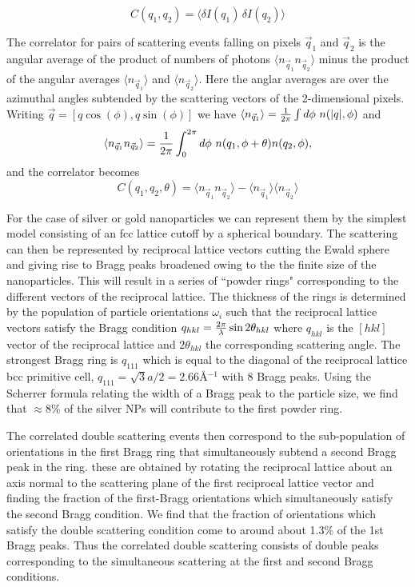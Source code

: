 \documentclass [11pt,fleqn]{article}
\def \be {\begin{equation}}
\def \ee {\end{equation}}
\begin{document}
\[
C(q_1, q_2) = \langle \delta I(q_1) \, \delta I(q_2) \rangle
\]

The correlator for pairs of scattering events falling on pixels $\vec{q}_1$ and $\vec{q}_2$ is the angular average of the product of numbers of photons $\langle n_{\vec{q}_1}n_{\vec{q}_2}\rangle$ minus the product of the angular averages $\langle n_{\vec{q}_1}\rangle$ and $\langle n_{\vec{q}_2}\rangle$.
Here the anglar averages are over the azimuthal angles subtended by the scattering vectors of the 2-dimensional pixels. Writing $\vec{q}=[q\cos(\phi),q\sin(\phi)]$ we have 
$\langle n_{\vec{q}_1}\rangle={1\over 2\pi}\int d\phi\ n(|q|,\phi) $ and
\be
\langle n_{\vec{q}_1}n_{\vec{q}_2}\rangle={1\over 2\pi}\int_0^{2\pi} d\phi\ n(q_1,\phi+\theta)n(q_2,\phi),
\ee
and the correlator becomes 
\be
C(q_1,q_2,\theta)=\langle n_{\vec{q}_1}n_{\vec{q}_2}\rangle-\langle n_{\vec{q}_1}\rangle \langle n_{\vec{q}_2}\rangle
\ee

For the case of silver or gold  nanoparticles we can represent them by the simplest model consisting of an fcc lattice cutoff by a spherical boundary. The scattering can then be represented by reciprocal lattice vectors cutting the Ewald sphere and giving rise to Bragg peaks broadened owing to the  the finite size of the nanoparticles.  This will result in a series of ``powder rings" corresponding to the different vectors of the reciprocal lattice. The thickness of the rings is determined by the population of particle orientations $\omega_i$ such that the reciprocal lattice vectors  satisfy the Bragg condition $q_{hkl}={2\pi\over\lambda}\sin 2\theta_{hkl}$ where $q_{hkl}$ is the $[hkl]$ vector of the reciprocal lattice and  $2\theta_{hkl}$ the corresponding scattering angle. The
strongest Bragg ring is $q_{111}$ which is equal to the diagonal of the reciprocal lattice bcc primitive cell, 
$q_{111}=\sqrt{3}a/2=2.66$\AA$^{-1}$ with 8 Bragg peaks. Using the Scherrer formula relating the width of a Bragg peak to the particle size, we find that $\approx 8\%$ of the silver NPs will contribute to the first powder ring. 

The correlated double scattering events then correspond to the sub-population of orientations in the first Bragg ring that simultaneously subtend a second Bragg peak in the ring. these are obtained by rotating the 
reciprocal lattice about an axis normal to the scattering plane of the first reciprocal lattice vector and finding the fraction of the first-Bragg orientations which simultaneously satisfy the second Bragg condition. 
We find that the fraction of orientations which satisfy the double scattering condition come to around about 1.3\% of the 1st Bragg peaks. Thus the correlated double scattering consists of double peaks corresponding to the simultaneous scattering at the first and second Bragg conditions.
\end{document}
